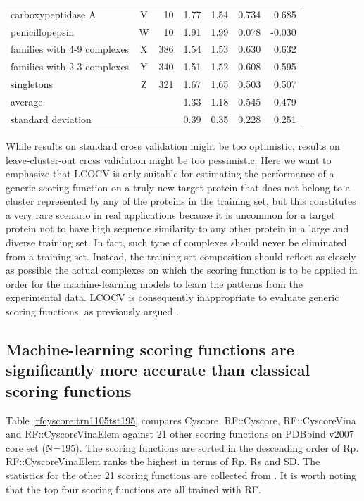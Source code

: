 \begin{table}
\begin{tabular}{lcrrrrr}
carboxypeptidase A             & V &  10 & 1.77 & 1.54 & 0.734 & 0.685\\
penicillopepsin                & W &  10 & 1.91 & 1.99 & 0.078 &-0.030\\
families with 4-9 complexes    & X & 386 & 1.54 & 1.53 & 0.630 & 0.632\\
families with 2-3 complexes    & Y & 340 & 1.51 & 1.52 & 0.608 & 0.595\\
singletons                     & Z & 321 & 1.67 & 1.65 & 0.503 & 0.507\\
average                        &   &     & 1.33 & 1.18 & 0.545 & 0.479\\
standard deviation             &   &     & 0.39 & 0.35 & 0.228 & 0.251\\
\hline
\end{tabular}
\end{table}

While results on standard cross validation might be too optimistic, results on leave-cluster-out cross validation might be too pessimistic. Here we want to emphasize that LCOCV is only suitable for estimating the performance of a generic scoring function on a truly new target protein that does not belong to a cluster represented by any of the proteins in the training set, but this constitutes a very rare scenario in real applications because it is uncommon for a target protein not to have high sequence similarity to any other protein in a large and diverse training set. In fact, such type of complexes should never be eliminated from a training set. Instead, the training set composition should reflect as closely as possible the actual complexes on which the scoring function is to be applied in order for the machine-learning models to learn the patterns from the experimental data. LCOCV is consequently inappropriate to evaluate generic scoring functions, as previously argued \citep{908}.

\subsection{Machine-learning scoring functions are significantly more accurate than classical scoring functions}

Table \ref{rfcyscore:trn1105tst195} compares Cyscore, RF::Cyscore, RF::CyscoreVina and RF::CyscoreVinaElem against 21 other scoring functions on PDBbind v2007 core set (N=195). The scoring functions are sorted in the descending order of Rp. RF::CyscoreVinaElem ranks the highest in terms of Rp, Rs and SD. The statistics for the other 21 scoring functions are collected from \citep{1362,1370,1347}. It is worth noting that the top four scoring functions are all trained with RF.

